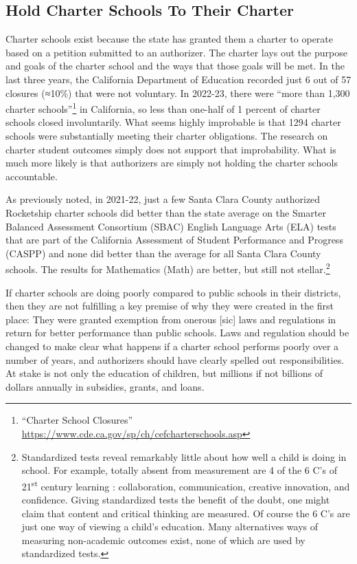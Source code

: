 \subsection{Hold Charter Schools To Their Charter}%
\label{sec:hold-charter-schools}\indent

Charter schools exist because the state has granted them a charter to operate based on a petition submitted to an authorizer. The charter lays out the purpose and goals of the charter school and the ways that those goals will be met. In the last three years, the California Department of Education  recorded just 6 out of 57 closures (≈10\%) that were not voluntary. In 2022-23, there were ``more than 1,300 charter schools''\footnote{``Charter School Closures'' \url{https://www.cde.ca.gov/sp/ch/cefcharterschools.asp}} in California, so less than one-half of 1 percent of charter schools closed involuntarily. What seems highly improbable is that 1294 charter schools were substantially meeting their charter obligations. The research on charter student outcomes simply does not support that improbability. What is much more likely is that authorizers are simply not holding the charter schools accountable.

As previously noted, in 2021-22, just a few Santa Clara County authorized Rocketship charter schools did better than the state average on the Smarter Balanced Assessment Consortium (SBAC) English Language Arts (ELA) tests that are part of the California Assessment of Student Performance and Progress (CASPP) and none did better than the average for all Santa Clara County schools. The results for Mathematics (Math) are better, but still not stellar.\footnote{Standardized tests reveal remarkably little about how well a child is doing in school. For example, totally absent from measurement are 4 of the 6 C's of 21\textsuperscript{st}  century learning \parencite{Hirsh-Pasek.etal2020}: collaboration, communication, creative innovation, and confidence. Giving standardized tests the benefit of the doubt, one might claim that content and critical thinking are measured. Of course the 6 C's are just one way of viewing a child's education. Many alternatives ways of measuring non-academic outcomes exist, none of which are used by standardized tests.}

If charter schools are doing poorly compared to public schools in their districts, then they are not fulfilling a key premise of why they were created in the first place: They were granted exemption from onerous [sic] laws and regulations in return for better performance than public schools. Laws and regulation should be changed to make clear what happens if a charter school performs poorly over a number of years, and authorizers should have clearly spelled out responsibilities. At stake is not only the education of children, but millions if not billions of dollars annually in subsidies, grants, and loans.

